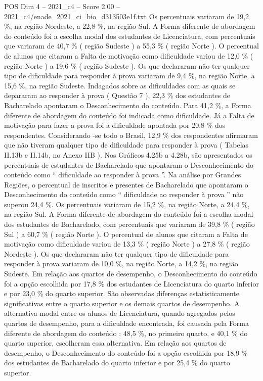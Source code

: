 \begin{textsample}{POS Dim 4 – 2021\_c4 – Score 2.00 – 2021\_c4/enade\_2021\_ci\_bio\_d313503e1f.txt}
Os percentuais variaram de 19,2 \%, na região Nordeste, a 22,8 \%, na região Sul.
A Forma diferente de abordagem do conteúdo foi a escolha modal dos estudantes de Licenciatura, com percentuais que variaram de 40,7 \% ( região Sudeste ) a 55,3 \% ( região Norte ).
O percentual de alunos que citaram a Falta de motivação como dificuldade variou de 12,0 \% ( região Norte ) a 19,6 \% ( região Sudeste ).
Os que declararam não ter qualquer tipo de dificuldade para responder à prova variaram de 9,4 \%, na região Norte, a 15,6 \%, na região Sudeste.
Indagados sobre as dificuldades com as quais se depararam ao responder à prova ( Questão 7 ), 22,3 \% dos estudantes de Bacharelado apontaram o Desconhecimento do conteúdo.
Para 41,2 \%, a Forma diferente de abordagem do conteúdo foi indicada como dificuldade.
Já a Falta de motivação para fazer a prova foi a dificuldade apontada por 20,8 \% dos respondentes.
Considerando -se todo o Brasil, 12,9 \% dos respondentes afirmaram que não tiveram qualquer tipo de dificuldade para responder à prova ( Tabelas II.13b e II.14b, no Anexo IIB ).
Nos Gráficos 4.25b a 4.28b, são apresentados os percentuais de estudantes de Bacharelado que apontaram o Desconhecimento do conteúdo como “ dificuldade ao responder à prova ”.
Na análise por Grandes Regiões, o percentual de inscritos e presentes de Bacharelado que apontaram o Desconhecimento do conteúdo como “ dificuldade ao responder à prova ” não superou 24,4 \%.
Os percentuais variaram de 15,2 \%, na região Norte, a 24,4 \%, na região Sul.
A Forma diferente de abordagem do conteúdo foi a escolha modal dos estudantes de Bacharelado, com percentuais que variaram de 39,8 \% ( região Sul ) a 60,7 \% ( região Norte ).
O percentual de alunos que citaram a Falta de motivação como dificuldade variou de 13,3 \% ( região Norte ) a 27,8 \% ( região Nordeste ).
Os que declararam não ter qualquer tipo de dificuldade para responder à prova variaram de 10,0 \%, na região Norte, a 14,2 \%, na região Sudeste.
Em relação aos quartos de desempenho, o Desconhecimento do conteúdo foi a opção escolhida por 17,8 \% dos estudantes de Licenciatura do quarto inferior e por 23,0 \% do quarto superior.
São observadas diferenças estatisticamente significativas entre o quarto superior e os demais quartos de desempenho.
A alternativa modal entre os alunos de Licenciatura, quando agregados pelos quartos de desempenho, para a dificuldade encontrada, foi causada pela Forma diferente de abordagem do conteúdo : 48,5 \%, no primeiro quarto, e 40,1 \% do quarto superior, escolheram essa alternativa.
Em relação aos quartos de desempenho, o Desconhecimento do conteúdo foi a opção escolhida por 18,9 \% dos estudantes de Bacharelado do quarto inferior e por 25,4 \% do quarto superior.

\end{textsample}
